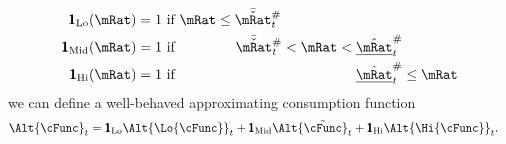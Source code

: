   \begin{equation*}\begin{gathered}\begin{aligned}
    \pmb{1}_{\text{Lo}}(\mRat)  & = 1 \text{~if $          \mRat \leq  \bar{\check{\mRat}}_{t}^{\#} \phantom{< \mRat <   \ushort{\hat{\mRat}}_{t}^{\#}          \leq \mRat}$}
    \\  \pmb{1}_{\text{Mid}}(\mRat)  & = 1 \text{~if $\phantom{ \mRat \leq}~ \bar{\check{\mRat}}_{t}^{\#}          < \mRat <   \ushort{\hat{\mRat}}_{t}^{\#} \phantom{\leq \mRat}$}
    \\  \pmb{1}_{\text{Hi}}(\mRat)  & = 1 \text{~if $\phantom{ \mRat \leq  ~\bar{\check{\mRat}}_{t}^{\#}          < \mRat < } \ushort{\hat{\mRat}}_{t}^{\#}           \leq \mRat$}
  \end{aligned}\end{gathered}\end{equation*}
  we can define a well-behaved approximating consumption function
  \begin{equation}\begin{gathered}\begin{aligned}
    \Alt{\cFunc}_{t}  & = \pmb{1}_{\text{Lo}} \Alt{\Lo{\cFunc}}_{t} + \pmb{1}_{\text{Mid}} \Alt{\tilde{\cFunc}}_{t}+\pmb{1}_{\text{Hi}} \Alt{\Hi{\cFunc}}_{t}.
  \end{aligned}\end{gathered}\end{equation}
